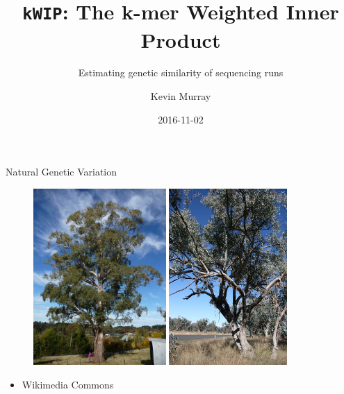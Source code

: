 \documentclass[t]{beamer}
\title{\texttt{kWIP}: The k-mer Weighted Inner Product}
\subtitle{Estimating genetic similarity of sequencing runs}
\author{Kevin Murray}
\institute{PhD Candidate\\ Borevitz Lab, ANU}
\date{2016-11-02}
\begin{document}
{
\begin{frame}
  \titlepage
  \vfill
\end{frame}
}

\begin{frame}{Natural Genetic Variation}
  \begin{figure}
    \centering
    \includegraphics[width=0.45\textwidth]{img/euc.jpg}
    \includegraphics[width=0.4\textwidth]{img/albens.jpg}
  \end{figure}
  \begin{itemize}
    \item[] \tiny{Wikimedia Commons}
  \end{itemize}
\end{frame}
\end{document}
